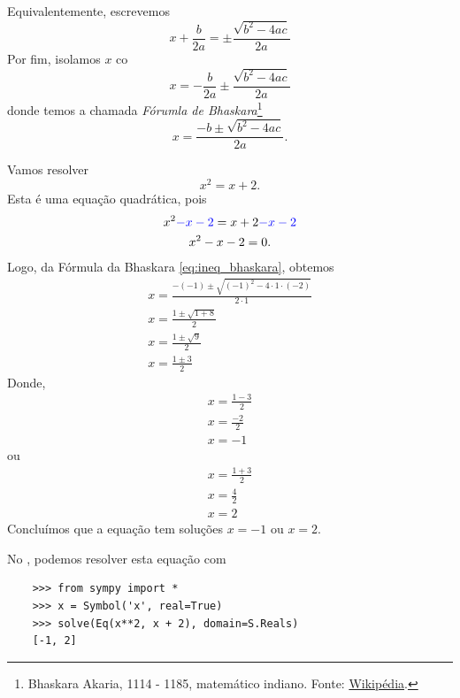 Equivalentemente, escrevemos
\begin{equation}
  x + \frac{b}{2a} = \pm\frac{\sqrt{b^2 - 4ac}}{2a}
\end{equation}
Por fim, isolamos $x$ co
\begin{equation}
  x = -\frac{b}{2a} \pm\frac{\sqrt{b^2 - 4ac}}{2a}
\end{equation}
donde temos a chamada \emph{Fórumla de Bhaskara}\footnote{Bhaskara Akaria, 1114 - 1185, matemático indiano. Fonte: \href{https://pt.wikipedia.org/wiki/Bhaskara\_II}{Wikipédia}.}
\begin{equation}\label{eq:ineq_bhaskara}
  x = \frac{-b \pm \sqrt{b^2 - 4ac}}{2a}.
\end{equation}

\begin{ex}
  Vamos resolver
  \begin{equation}
    x^2 = x + 2.
  \end{equation}
  Esta é uma equação quadrática, pois
  \begin{gather}
    x^2 {\color{blue}- x - 2} = x + 2 {\color{blue}- x - 2} \\
    x^2 -x - 2 = 0.
  \end{gather}
  Logo, da Fórmula da Bhaskara \eqref{eq:ineq_bhaskara}, obtemos
  \begin{gather}
    x = \frac{-(-1) \pm \sqrt{(-1)^2 - 4\cdot 1 \cdot (-2)}}{2\cdot 1} \\
    x = \frac{1 \pm \sqrt{1 + 8}}{2} \\
    x = \frac{1 \pm \sqrt{9}}{2} \\
    x = \frac{1 \pm 3}{2}
  \end{gather}
  Donde,
  \begin{gather}
    x = \frac{1 - 3}{2} \\
    x = \frac{-2}{2} \\
    x = -1
  \end{gather}
  ou
  \begin{gather}
    x = \frac{1 + 3}{2} \\
    x = \frac{4}{2} \\
    x = 2
  \end{gather}
  Concluímos que a equação tem soluções $x=-1$ ou $x=2$.

  \ifispython
  No \python, podemos resolver esta equação com
  \begin{lstlisting}
    >>> from sympy import *
    >>> x = Symbol('x', real=True)
    >>> solve(Eq(x**2, x + 2), domain=S.Reals)
    [-1, 2]
  \end{lstlisting}
  \fi
\end{ex}

